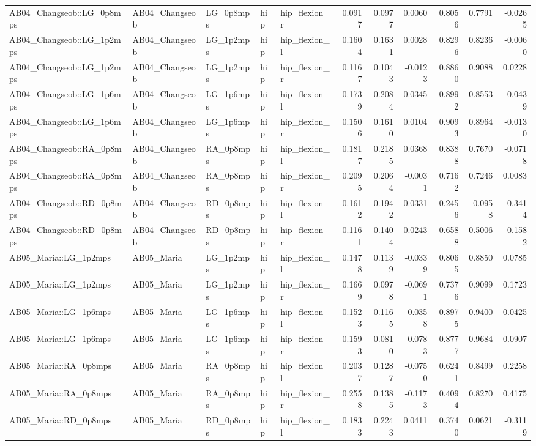 \begin{table}
\begin{tabular}{lllllrrrrrr}
AB04_Changseob::LG_0p8mps & AB04_Changseob & LG_0p8mps & hip & hip_flexion_r & 0.0917 & 0.0977 & 0.0060 & 0.8056 & 0.7791 & -0.0265 \\
AB04_Changseob::LG_1p2mps & AB04_Changseob & LG_1p2mps & hip & hip_flexion_l & 0.1604 & 0.1631 & 0.0028 & 0.8296 & 0.8236 & -0.0060 \\
AB04_Changseob::LG_1p2mps & AB04_Changseob & LG_1p2mps & hip & hip_flexion_r & 0.1167 & 0.1043 & -0.0123 & 0.8860 & 0.9088 & 0.0228 \\
AB04_Changseob::LG_1p6mps & AB04_Changseob & LG_1p6mps & hip & hip_flexion_l & 0.1739 & 0.2084 & 0.0345 & 0.8992 & 0.8553 & -0.0439 \\
AB04_Changseob::LG_1p6mps & AB04_Changseob & LG_1p6mps & hip & hip_flexion_r & 0.1506 & 0.1610 & 0.0104 & 0.9093 & 0.8964 & -0.0130 \\
AB04_Changseob::RA_0p8mps & AB04_Changseob & RA_0p8mps & hip & hip_flexion_l & 0.1817 & 0.2185 & 0.0368 & 0.8388 & 0.7670 & -0.0718 \\
AB04_Changseob::RA_0p8mps & AB04_Changseob & RA_0p8mps & hip & hip_flexion_r & 0.2095 & 0.2064 & -0.0031 & 0.7162 & 0.7246 & 0.0083 \\
AB04_Changseob::RD_0p8mps & AB04_Changseob & RD_0p8mps & hip & hip_flexion_l & 0.1612 & 0.1942 & 0.0331 & 0.2456 & -0.0958 & -0.3414 \\
AB04_Changseob::RD_0p8mps & AB04_Changseob & RD_0p8mps & hip & hip_flexion_r & 0.1161 & 0.1404 & 0.0243 & 0.6588 & 0.5006 & -0.1582 \\
AB05_Maria::LG_1p2mps & AB05_Maria & LG_1p2mps & hip & hip_flexion_l & 0.1478 & 0.1139 & -0.0339 & 0.8065 & 0.8850 & 0.0785 \\
AB05_Maria::LG_1p2mps & AB05_Maria & LG_1p2mps & hip & hip_flexion_r & 0.1669 & 0.0978 & -0.0691 & 0.7376 & 0.9099 & 0.1723 \\
AB05_Maria::LG_1p6mps & AB05_Maria & LG_1p6mps & hip & hip_flexion_l & 0.1523 & 0.1165 & -0.0358 & 0.8975 & 0.9400 & 0.0425 \\
AB05_Maria::LG_1p6mps & AB05_Maria & LG_1p6mps & hip & hip_flexion_r & 0.1593 & 0.0810 & -0.0783 & 0.8777 & 0.9684 & 0.0907 \\
AB05_Maria::RA_0p8mps & AB05_Maria & RA_0p8mps & hip & hip_flexion_l & 0.2037 & 0.1287 & -0.0750 & 0.6241 & 0.8499 & 0.2258 \\
AB05_Maria::RA_0p8mps & AB05_Maria & RA_0p8mps & hip & hip_flexion_r & 0.2558 & 0.1385 & -0.1173 & 0.4094 & 0.8270 & 0.4175 \\
AB05_Maria::RD_0p8mps & AB05_Maria & RD_0p8mps & hip & hip_flexion_l & 0.1833 & 0.2243 & 0.0411 & 0.3740 & 0.0621 & -0.3119 \\

\end{tabular}
\end{table}
